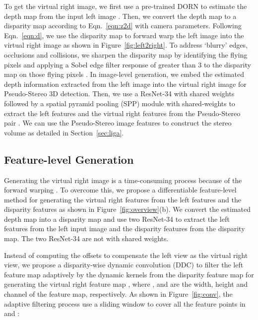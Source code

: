 \documentclass[10pt,twocolumn,letterpaper]{article}
\begin{document}
To get the virtual right image, we first use a pre-trained DORN \cite{fu2018deep} to estimate the depth map  from the input left image . Then, we convert the depth map  to a disparity map  according to Eqn.~\ref{eqn:z2d} with camera parameters. Following Eqn.~\ref{eqn:d}, we use the disparity map to forward warp the left image  \cite{schwarz2007non} into the virtual right image  as shown in Figure~\ref{fig:left2right}. To address ‘blurry’ edges, occlusions and collisions, we sharpen the disparity map by identifying the flying pixels and applying a Sobel edge filter response of greater than 3 to the disparity map on those flying pixels \cite{hu2019revisiting,watson2020learning}. In image-level generation, we embed the estimated depth information extracted from the left image into the virtual right image for Pseudo-Stereo 3D detection. Then, we use a ResNet-34 \cite{he2016deep} with shared weights followed by a spatial pyramid pooling (SPP) module with shared-weights to extract the left features  and the virtual right features  from the Pseudo-Stereo pair . We can use the Pseudo-Stereo image features to construct the stereo volume  as detailed in Section~\ref{sec:liga}.   

\subsection{Feature-level Generation}\label{sec:img2feat}
Generating the virtual right image is a time-consuming process because of the forward warping \cite{hu2019revisiting,watson2020learning}. To overcome this, we propose a differentiable feature-level method for generating the virtual right features from the left features and the disparity features as shown in Figure~\ref{fig:overview}(b). We convert the estimated depth map into a disparity map and use two ResNet-34 \cite{he2016deep} to extract the left features  from the left input image and the disparity features  from the disparity map. The two ResNet-34 are not with shared weights. 

Instead of computing the offsets to compensate the left view as the virtual right view, we propose a disparity-wise dynamic convolution (DDC) to filter the left feature map  adaptively by the dynamic kernels from the disparity feature map  for generating the virtual right feature map , where ,  and  are the width, height and channel of the feature map, respectively. As shown in Figure~\ref{fig:conv}, the adaptive filtering process use a  sliding window to cover all the feature points in  and :
\end{document}
